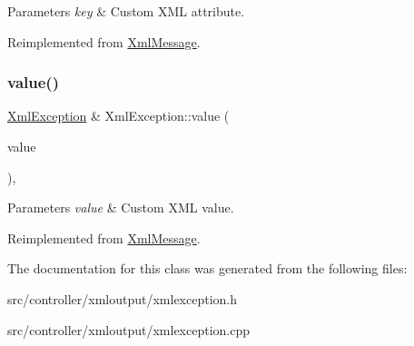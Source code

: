 \begin{DoxyParams}{Parameters}
{\em key} & Custom X\+ML attribute. \\
\hline
\end{DoxyParams}


Reimplemented from \hyperlink{classXmlMessage_a01b2e1d62348aad36158687344d50518}{Xml\+Message}.

\mbox{\label{classXmlException_ae51cb72a2a9db85e12409c5e3408ea4d}} 
\subsubsection{\texorpdfstring{value()}{value()}}
{\footnotesize\ttfamily \hyperlink{classXmlException}{Xml\+Exception} \& Xml\+Exception\+::value (\begin{DoxyParamCaption}\item[{const Q\+String \&}]{value }\end{DoxyParamCaption})\hspace{0.3cm}{\ttfamily [override]}, {\ttfamily [virtual]}}


\begin{DoxyParams}{Parameters}
{\em value} & Custom X\+ML value. \\
\hline
\end{DoxyParams}


Reimplemented from \hyperlink{classXmlMessage_aef54b1b878c75f170139d1885597cb63}{Xml\+Message}.



The documentation for this class was generated from the following files\+:\begin{DoxyCompactItemize}
\item 
src/controller/xmloutput/xmlexception.\+h\item 
src/controller/xmloutput/xmlexception.\+cpp\end{DoxyCompactItemize}
